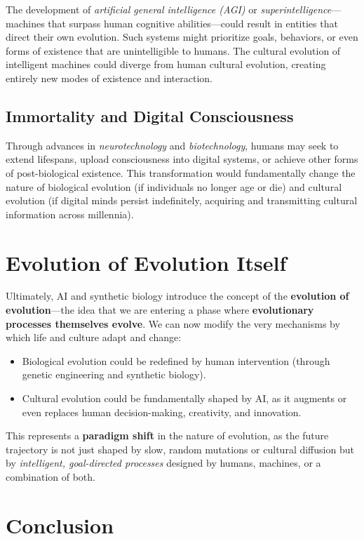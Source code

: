 \documentclass[12pt,titlepage]{book}
\begin{document}
The development of \textit{artificial general intelligence (AGI)} or \textit{superintelligence}—machines that surpass human cognitive abilities—could result in entities that direct their own evolution. Such systems might prioritize goals, behaviors, or even forms of existence that are unintelligible to humans. The cultural evolution of intelligent machines could diverge from human cultural evolution, creating entirely new modes of existence and interaction.

\subsection{Immortality and Digital Consciousness}

Through advances in \textit{neurotechnology} and \textit{biotechnology}, humans may seek to extend lifespans, upload consciousness into digital systems, or achieve other forms of post-biological existence. This transformation would fundamentally change the nature of biological evolution (if individuals no longer age or die) and cultural evolution (if digital minds persist indefinitely, acquiring and transmitting cultural information across millennia).

\section{Evolution of Evolution Itself}

Ultimately, AI and synthetic biology introduce the concept of the \textbf{evolution of evolution}—the idea that we are entering a phase where \textbf{evolutionary processes themselves evolve}. We can now modify the very mechanisms by which life and culture adapt and change:
\begin{itemize}
    \item Biological evolution could be redefined by human intervention (through genetic engineering and synthetic biology).
    \item Cultural evolution could be fundamentally shaped by AI, as it augments or even replaces human decision-making, creativity, and innovation.
\end{itemize}

This represents a \textbf{paradigm shift} in the nature of evolution, as the future trajectory is not just shaped by slow, random mutations or cultural diffusion but by \textit{intelligent, goal-directed processes} designed by humans, machines, or a combination of both.

\section{Conclusion}
\end{document}
